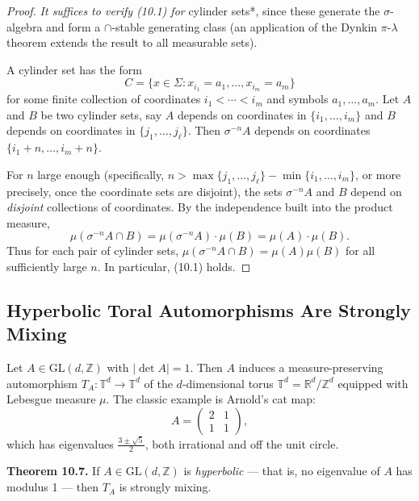 \begin{proof}
\textit{ It suffices to verify (10.1) for }cylinder sets*, since these generate the $\sigma$-algebra and form a $\cap$-stable generating class (an application of the Dynkin $\pi$-$\lambda$ theorem extends the result to all measurable sets).

A cylinder set has the form
\[
C = \{x \in \Sigma : x_{i_1} = a_1, \ldots, x_{i_m} = a_m\}
\]
for some finite collection of coordinates $i_1 < \cdots < i_m$ and symbols $a_1, \ldots, a_m$. Let $A$ and $B$ be two cylinder sets, say $A$ depends on coordinates in $\{i_1, \ldots, i_m\}$ and $B$ depends on coordinates in $\{j_1, \ldots, j_\ell\}$. Then $\sigma^{-n}A$ depends on coordinates $\{i_1 + n, \ldots, i_m + n\}$.

For $n$ large enough (specifically, $n > \max\{j_1, \ldots, j_\ell\} - \min\{i_1, \ldots, i_m\}$, or more precisely, once the coordinate sets are disjoint), the sets $\sigma^{-n}A$ and $B$ depend on \textit{disjoint} collections of coordinates. By the independence built into the product measure,
\[
\mu(\sigma^{-n}A \cap B) = \mu(\sigma^{-n}A) \cdot \mu(B) = \mu(A) \cdot \mu(B).
\]
Thus for each pair of cylinder sets, $\mu(\sigma^{-n}A \cap B) = \mu(A)\mu(B)$ for all sufficiently large $n$. In particular, (10.1) holds.
\end{proof}


\subsection{Hyperbolic Toral Automorphisms Are Strongly Mixing}\label{sec:10.3.2}

Let $A \in \text{GL}(d, \mathbb{Z})$ with $|\det A| = 1$. Then $A$ induces a measure-preserving automorphism $T_A: \mathbb{T}^d \to \mathbb{T}^d$ of the $d$-dimensional torus $\mathbb{T}^d = \mathbb{R}^d / \mathbb{Z}^d$ equipped with Lebesgue measure $\mu$. The classic example is Arnold's cat map:
\[
A = \begin{pmatrix} 2 & 1 \\ 1 & 1 \end{pmatrix},
\]
which has eigenvalues $\frac{3 \pm \sqrt{5}}{2}$, both irrational and off the unit circle.

\textbf{Theorem 10.7.} If $A \in \text{GL}(d, \mathbb{Z})$ is \textit{hyperbolic} --- that is, no eigenvalue of $A$ has modulus 1 --- then $T_A$ is strongly mixing.

